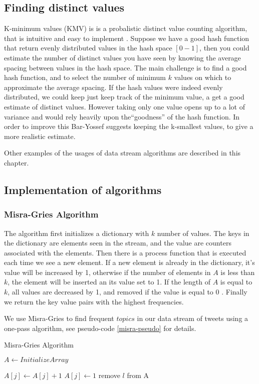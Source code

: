 \subsection{Finding distinct values}\label{algo-distinct}
K-minimum values (KMV) is is a probalistic distinct value counting algorithm, that is intuitive and easy to implement \cite{kmv}. Suppose we have a good hash function that return evenly distributed values in the hash space $[0-1]$, then you could estimate the number of distinct values you have seen by knowing the average spacing between values in the hash space. The main challenge is to find a good hash function, and to select the number of minimum $k$ values on which to approximate the average spacing. If the hash values were indeed evenly distributed, we could keep just keep track of the minimum value, a get a good estimate of distinct values. However taking only one value opens up to a lot of variance and would rely heavily upon the``goodness'' of the hash function. In order to improve this Bar-Yossef\cite{Bar-Yossef} suggests keeping the k-smallest values, to give a more realistic estimate.
   
Other examples of the usages of data stream algorithms are described in this chapter.
\subsection{Implementation of algorithms}

\subsubsection{Misra-Gries Algorithm}\label{misra-gries}
The algorithm first initializes a dictionary with $k$ number of values. The keys in the dictionary are elements seen in the stream, and the value are counters associated with the elements. Then there is a process function that is executed each time we see a new element. If a new element is already in the dictionary, it's value will be increased by 1, otherwise if the number of elements in $A$ is less than $k$, the element will be inserted an its value set to 1. If the length of $A$ is equal to $k$, all values are decreased by 1, and removed if the value is equal to 0 \cite{Amit}. Finally we return the key value pairs with the highest frequencies.

We use Misra-Gries to find frequent $topics$ in our data stream of tweets using a one-pass algorithm, see pseudo-code \ref{misra-pseudo} for details.
\begin{algorithm}
\caption{Misra-Gries Algorithm}\label{misra-pseudo}
\begin{algorithmic}[1]
\State $A\gets Initialize Array$

    \State $A[j] \leftarrow A[j] + 1$
    \State $A[j] \leftarrow 1$
\Else
         remove $l$ from A
        \EndIf
    \EndFor
\EndIf
\EndFunction
\end{algorithmic}
\end{algorithm}
